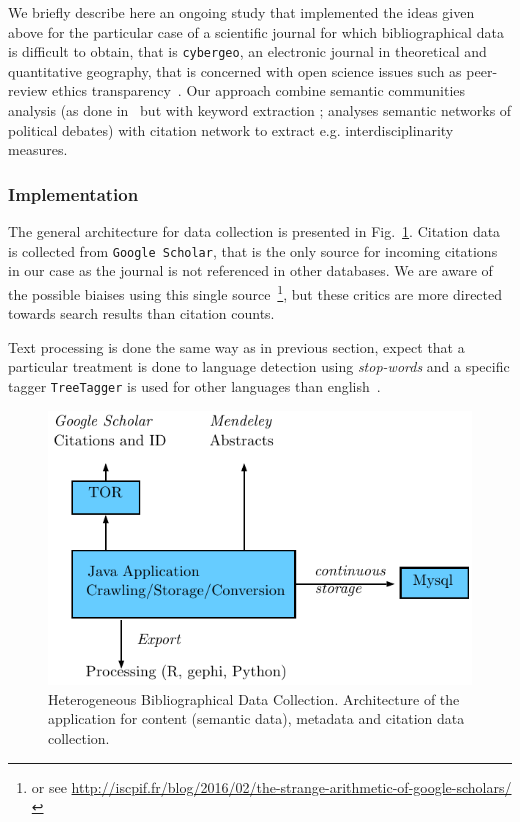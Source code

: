We briefly describe here an ongoing study that implemented the ideas given above for the particular case of a scientific journal for which bibliographical data is difficult to obtain, that is \texttt{cybergeo}, an electronic journal in theoretical and quantitative geography, that is concerned with open science issues such as peer-review ethics transparency~\cite{10.1371/journal.pone.0147913}. Our approach combine semantic communities analysis (as done in~\cite{2016arXiv160208451P} but with keyword extraction ; \cite{2015arXiv151003797G} analyses semantic networks of political debates) with citation network to extract e.g. interdisciplinarity measures.

\subsubsection{Implementation}

The general architecture for data collection is presented in Fig.~\ref{fig:quantepistemo:data}. Citation data is collected from \texttt{Google Scholar}, that is the only source for incoming citations~\cite{noruzi2005google} in our case as the journal is not referenced in other databases. We are aware of the possible biaises using this single source~\cite{bohannon2014scientific}\footnote{or see \url{http://iscpif.fr/blog/2016/02/the-strange-arithmetic-of-google-scholars/}}, but these critics are more directed towards search results than citation counts. 

Text processing is done the same way as in previous section, expect that a particular treatment is done to language detection using \emph{stop-words} and a specific tagger \texttt{TreeTagger} is used for other languages than english~\cite{schmid1994probabilistic}.



\begin{figure}
\includegraphics[width=\textwidth]{Figures/PartI/QuantitativeEpistemo/HyperNetwork/archi}
\caption[Heterogeneous Bibliographical Data Collection]{Heterogeneous Bibliographical Data Collection. Architecture of the application for content (semantic data), metadata and citation data collection.}
\label{fig:quantepistemo:data}
\end{figure}


